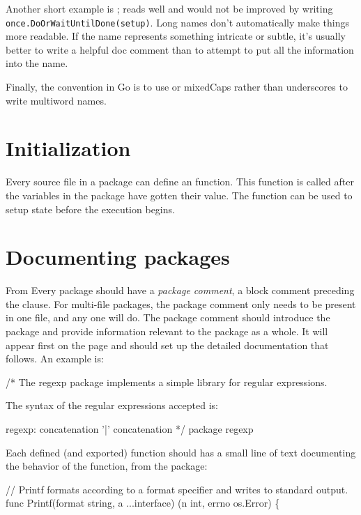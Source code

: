 Another short example is ;  reads well and would
not be improved by writing \lstinline{once.DoOrWaitUntilDone(setup)}. Long names
don't automatically make things more readable. If the name represents
something intricate or subtle, it's usually better to write a helpful
doc comment than to attempt to put all the information into the name.

Finally, the convention in Go is to use  or mixedCaps rather
than underscores to write multiword names.

\section{Initialization}
Every source file in a package can define an  function. This function is
called after the variables in the package have gotten their value. The
 function can be used to setup state before the execution
begins.

\section{Documenting packages}
From \cite{effective_go}
Every package should have a \emph{package comment}, a block comment preceding the
 clause. For multi-file packages, the package comment only needs to be
present in one file, and any one will do. The package comment should introduce
the package and provide information relevant to the package as a whole. It will
appear first on the  page and should set up the detailed documentation
that follows. An example is:
\begin{display}
/*
    The regexp package implements a simple library for
    regular expressions.

    The syntax of the regular expressions accepted is:

    regexp:
        concatenation { '|' concatenation }
*/
package regexp
\end{display}

Each defined (and exported) function should has a small line of text
documenting the behavior of the function, from the 
package:
\begin{display}
// Printf formats according to a format specifier and writes to standard output.
func Printf(format string, a ...interface{}) (n int, errno os.Error) \{
\end{display}

